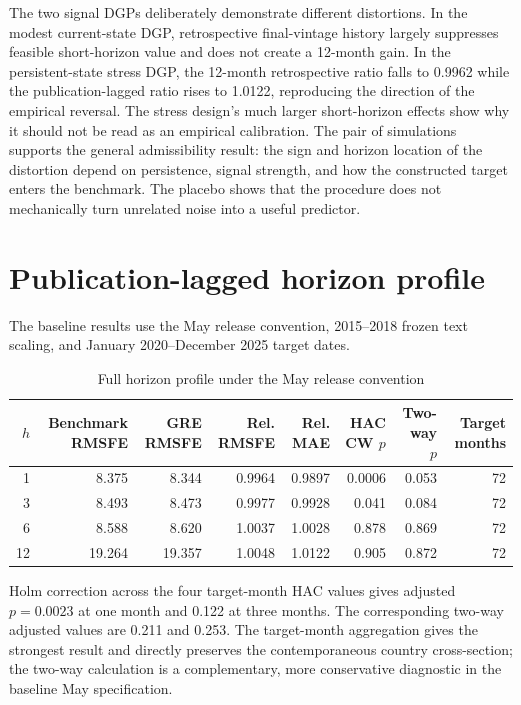 \documentclass[12pt]{article}
\begin{document}
The two signal DGPs deliberately demonstrate different distortions. In the modest current-state DGP, retrospective final-vintage history largely suppresses feasible short-horizon value and does not create a 12-month gain. In the persistent-state stress DGP, the 12-month retrospective ratio falls to 0.9962 while the publication-lagged ratio rises to 1.0122, reproducing the direction of the empirical reversal. The stress design's much larger short-horizon effects show why it should not be read as an empirical calibration. The pair of simulations supports the general admissibility result: the sign and horizon location of the distortion depend on persistence, signal strength, and how the constructed target enters the benchmark. The placebo shows that the procedure does not mechanically turn unrelated noise into a useful predictor.

\section{Publication-lagged horizon profile}
The baseline results use the May release convention, 2015--2018 frozen text scaling, and January 2020--December 2025 target dates.
\begin{table}[htbp]
\centering\scriptsize
\caption{Full horizon profile under the May release convention}
\begin{tabular}{rrrrrrrr}
\toprule
$h$ & Benchmark RMSFE & GRE RMSFE & Rel. RMSFE & Rel. MAE & HAC CW $p$ & Two-way $p$ & Target months\\
\midrule
1 & 8.375 & 8.344 & 0.9964 & 0.9897 & 0.0006 & 0.053 & 72\\
3 & 8.493 & 8.473 & 0.9977 & 0.9928 & 0.041 & 0.084 & 72\\
6 & 8.588 & 8.620 & 1.0037 & 1.0028 & 0.878 & 0.869 & 72\\
12 & 19.264 & 19.357 & 1.0048 & 1.0122 & 0.905 & 0.872 & 72\\
\bottomrule
\end{tabular}
\end{table}

Holm correction across the four target-month HAC values gives adjusted $p=0.0023$ at one month and 0.122 at three months. The corresponding two-way adjusted values are 0.211 and 0.253. The target-month aggregation gives the strongest result and directly preserves the contemporaneous country cross-section; the two-way calculation is a complementary, more conservative diagnostic in the baseline May specification.
\end{document}

